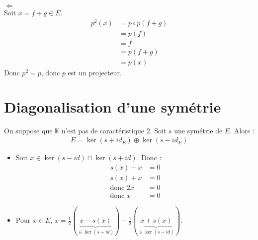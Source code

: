 \documentclass[../main.tex]{subfiles}
\begin{document}
$\boxed{\Leftarrow}$ \\
Soit $x = f + g \in E$. 
\begin{align*}
    p^2(x) &= p \circ p(f + g) \\
    &= p(f) \\
    &= f \\
    &= p(f + g) \\
    &= p(x)
\end{align*}
Donc $p^2 = p$, donc $p$ est un projecteur.

\section{Diagonalisation d'une symétrie}
\begin{tcolorbox}[title=Théorème 21.59, title filled=false, colframe=orange, colback=orange!10!white]
    On suppose que $\mathbb{K}$ n'est pas de caractéristique 2. Soit $s$ une symétrie de $E$. Alors :
    \begin{align*}
        E = \ker(s + id_E) \oplus \ker(s - id_E)
    \end{align*}
\end{tcolorbox}

\begin{itemize}
    \item Soit $x\in \ker(s - id) \cap \ker(s + id)$. Donc : 
    \begin{align*}
        s(x) - x &= 0 \\
        s(x) + x &= 0 \\
        \text{donc } 2x &= 0 \\
        \text{donc } x &= 0
    \end{align*}

    \item Pour $x \in E$, $x = \frac{1}{2}(\underbrace{x - s(x)}_{\in \ker(s + id)}) + \frac{1}{2}(\underbrace{x + s(x)}_{\in \ker(s - id)})$. \\
\end{itemize}
\end{document}
